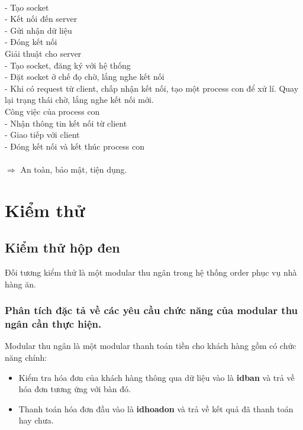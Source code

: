 \documentclass[a4paper,12pt]{report}
\begin{document}
\begin{itemize}
	\\ \hspace*{3mm} - Tạo socket
	\\ \hspace*{3mm} - Kết nối đến server
	\\ \hspace*{3mm} - Gửi nhận dữ liệu
	\\ \hspace*{3mm} - Đóng kết nối
	\\ Giải thuật cho server
	\\ \hspace*{3mm} - Tạo socket, đăng ký với hệ thống
	\\ \hspace*{3mm} - Đặt socket ở chế đọ chờ, lắng nghe kết nối
	\\ \hspace*{3mm} - Khi có request từ client, chấp nhận kết nối, tạo một process con để xử lí. Quay lại trạng thái chờ, lắng nghe kết nối mới.
	\\ Công việc của process con
	\\ \hspace*{3mm} - Nhận thông tin kết nối từ client
	\\ \hspace*{3mm} - Giao tiếp với client
	\\ \hspace*{3mm} - Đóng kết nối và kết thúc process con
	\\
	\\ $\Rightarrow$ An toàn, bảo mật, tiện dụng.
	
\end{itemize}
\chapter{Kiểm thử}
\section{Kiểm thử hộp đen}
Đối tương kiểm thử là một modular thu ngân trong hệ thống order phục vụ nhà hàng ăn.
\subsection{Phân tích đặc tả về các yêu cầu chức năng của modular thu ngân cần thực hiện.}
Modular thu ngân là một modular thanh toán tiền cho khách hàng gồm có chức năng chính:
\begin{itemize}
\item Kiểm tra hóa đơn của khách hàng thông qua dữ liệu vào là \textbf{idban} và trả về hóa đơn tương ứng với bàn đó.
\item Thanh toán hóa đơn đầu vào là \textbf{idhoadon} và trả về kết quả đã thanh toán hay chưa.
\end{itemize}
\end{document}
